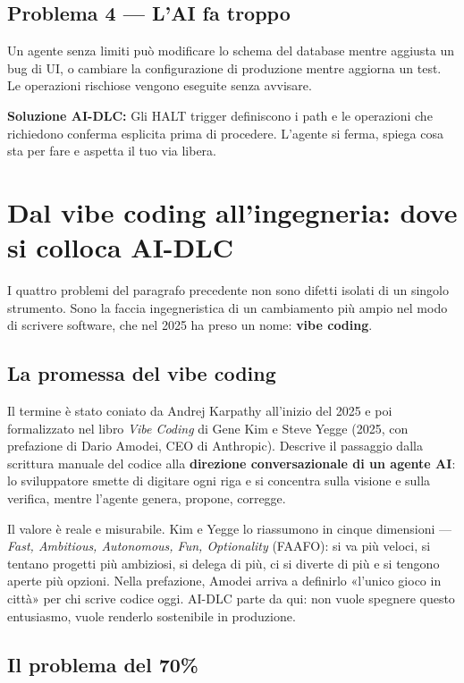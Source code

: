 \subsection*{Problema 4 --- L'AI fa troppo}

Un agente senza limiti può modificare lo schema del database mentre aggiusta un bug di UI, o cambiare la configurazione di produzione mentre aggiorna un test. Le operazioni rischiose vengono eseguite senza avvisare.

\textbf{Soluzione AI-DLC:} Gli HALT trigger definiscono i path e le operazioni che richiedono conferma esplicita prima di procedere. L'agente si ferma, spiega cosa sta per fare e aspetta il tuo via libera.

\section{Dal vibe coding all'ingegneria: dove si colloca AI-DLC}
\label{sec:01-vibe-coding}

I quattro problemi del paragrafo precedente non sono difetti isolati di un singolo strumento. Sono la faccia ingegneristica di un cambiamento più ampio nel modo di scrivere software, che nel 2025 ha preso un nome: \textbf{vibe coding}.

\subsection*{La promessa del vibe coding}

Il termine è stato coniato da Andrej Karpathy all'inizio del 2025 e poi formalizzato nel libro \textit{Vibe Coding} di Gene Kim e Steve Yegge (2025, con prefazione di Dario Amodei, CEO di Anthropic). Descrive il passaggio dalla scrittura manuale del codice alla \textbf{direzione conversazionale di un agente AI}: lo sviluppatore smette di digitare ogni riga e si concentra sulla visione e sulla verifica, mentre l'agente genera, propone, corregge.

Il valore è reale e misurabile. Kim e Yegge lo riassumono in cinque dimensioni --- \textit{Fast, Ambitious, Autonomous, Fun, Optionality} (FAAFO): si va più veloci, si tentano progetti più ambiziosi, si delega di più, ci si diverte di più e si tengono aperte più opzioni. Nella prefazione, Amodei arriva a definirlo «l'unico gioco in città» per chi scrive codice oggi. AI-DLC parte da qui: non vuole spegnere questo entusiasmo, vuole renderlo sostenibile in produzione.

\subsection*{Il problema del 70\%}


